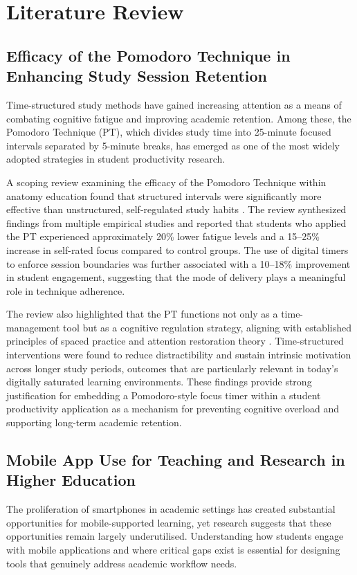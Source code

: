 \chapter{Literature Review}

\section{Efficacy of the Pomodoro Technique in Enhancing Study Session Retention}
Time-structured study methods have gained increasing attention as a means of combating cognitive fatigue and improving academic retention. Among these, the Pomodoro Technique (PT), which divides study time into 25-minute focused intervals separated by 5-minute breaks, has emerged as one of the most widely adopted strategies in student productivity research.

A scoping review examining the efficacy of the Pomodoro Technique within anatomy education found that structured intervals were significantly more effective than unstructured, self-regulated study habits \citep{Ogut2025}. The review synthesized findings from multiple empirical studies and reported that students who applied the PT experienced approximately 20\% lower fatigue levels and a 15--25\% increase in self-rated focus compared to control groups. The use of digital timers to enforce session boundaries was further associated with a 10--18\% improvement in student engagement, suggesting that the mode of delivery plays a meaningful role in technique adherence.

The review also highlighted that the PT functions not only as a time-management tool but as a cognitive regulation strategy, aligning with established principles of spaced practice and attention restoration theory \citep{Ogut2025}. Time-structured interventions were found to reduce distractibility and sustain intrinsic motivation across longer study periods, outcomes that are particularly relevant in today's digitally saturated learning environments. These findings provide strong justification for embedding a Pomodoro-style focus timer within a student productivity application as a mechanism for preventing cognitive overload and supporting long-term academic retention.

\section{Mobile App Use for Teaching and Research in Higher Education}
The proliferation of smartphones in academic settings has created substantial opportunities for mobile-supported learning, yet research suggests that these opportunities remain largely underutilised. Understanding how students engage with mobile applications and where critical gaps exist is essential for designing tools that genuinely address academic workflow needs.

